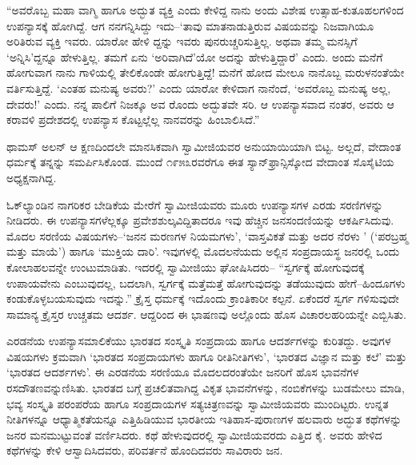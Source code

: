 “ಅವರೊಬ್ಬ ಮಹಾ ವಾಗ್ಮಿ ಹಾಗೂ ಅದ್ಭುತ ವ್ಯಕ್ತಿ ಎಂದು ಕೇಳಿದ್ದ ನಾನು ಅಂದು ವಿಶೇಷ ಉತ್ಸಾಹ-ಕುತೂಹಲಗಳಿಂದ ಉಪನ್ಯಾಸಕ್ಕೆ ಹೋಗಿದ್ದೆ. ಆಗ ನನಗನ್ನಿಸಿದ್ದು ಇದು–‘ತಾವು ಮಾತನಾಡುತ್ತಿರುವ ವಿಷಯವನ್ನು ನಿಜವಾಗಿಯೂ ಅರಿತಿರುವ ವ್ಯಕ್ತಿ ಇವರು. ಯಾರೋ ಹೇಳಿ ದ್ದನ್ನು ಇವರು ಪುನರುಚ್ಚರಿಸುತ್ತಿಲ್ಲ. ಅಥವಾ ತಮ್ಮ ಮನಸ್ಸಿಗೆ ‘ಅನ್ನಿಸಿ’ದ್ದನ್ನೂ ಹೇಳುತ್ತಿಲ್ಲ. ತಮಗೆ ಏನು ‘ಅರಿವಾಗಿದೆ’ಯೋ ಅದನ್ನು ಹೇಳುತ್ತಿದ್ದಾರೆ’ ಎಂದು. ಅಂದು ಮನೆಗೆ ಹೋಗುವಾಗ ನಾನು ಗಾಳಿಯಲ್ಲಿ ತೇಲಿಕೊಂಡೇ ಹೋಗುತ್ತಿದ್ದೆ! ಮನೆಗೆ ಹೋದ ಮೇಲೂ ನಾನೊಬ್ಬ ಮರುಳನಂತೆಯೇ ವರ್ತಿಸುತ್ತಿದ್ದೆ. ‘ಎಂತಹ ಮನುಷ್ಯ ಅವರು?’ ಎಂದು ಯಾರೋ ಕೇಳಿದಾಗ ನಾನೆಂದೆ, ‘ಅವರೊಬ್ಬ ಮನುಷ್ಯ ಅಲ್ಲ, ದೇವರು!’ ಎಂದು. ನನ್ನ ಪಾಲಿಗೆ ನಿಜಕ್ಕೂ ಅವ ರೊಂದು ಅದ್ಭುತವೇ ಸರಿ. ಆ ಉಪನ್ಯಾಸವಾದ ನಂತರ, ಅವರು ಆ ಕರಾವಳಿ ಪ್ರದೇಶದಲ್ಲಿ ಉಪನ್ಯಾಸ ಕೊಟ್ಟಲ್ಲೆಲ್ಲ ನಾನವರನ್ನು ಹಿಂಬಾಲಿಸಿದೆ.”

ಥಾಮಸ್ ಅಲನ್ ಆ ಕ್ಷಣದಿಂದಲೇ ಮಾನಸಿಕವಾಗಿ ಸ್ವಾಮೀಜಿಯವರ ಅನುಯಾಯಿಯಾಗಿ ಬಿಟ್ಟ. ಅಲ್ಲದೆ, ವೇದಾಂತ ಧರ್ಮಕ್ಕೆ ತನ್ನನ್ನು ಸಮರ್ಪಿಸಿಕೊಂಡ. ಮುಂದೆ ೧೯೫೩ರವರೆಗೂ ಈತ ಸ್ಯಾನ್​ಫ್ರಾನ್ಸಿಸ್ಕೋದ ವೇದಾಂತ ಸೊಸೈಟಿಯ ಅಧ್ಯಕ್ಷನಾಗಿದ್ದ.

ಓಕ್​ಲ್ಯಾಂಡಿನ ನಾಗರಿಕರ ಬೇಡಿಕೆಯ ಮೇರೆಗೆ ಸ್ವಾಮೀಜಿಯವರು ಮೂರು ಉಪನ್ಯಾಸಗಳ ಎರಡು ಸರಣಿಗಳನ್ನು ನೀಡಿದರು. ಈ ಉಪನ್ಯಾಸಗಳೆಲ್ಲಕ್ಕೂ ಪ್ರವೇಶಶುಲ್ಕವಿದ್ದಿತಾದರೂ ಇವು ಹೆಚ್ಚಿನ ಜನಸಂದಣಿಯನ್ನು ಆಕರ್ಷಿಸಿದುವು. ಮೊದಲ ಸರಣಿಯ ವಿಷಯಗಳು–‘ಜನನ ಮರಣಗಳ ನಿಯಮಗಳು’, ‘ವಾಸ್ತವಿಕತೆ ಮತ್ತು ಅದರ ನೆರಳು ’ (‘ಪರಬ್ರಹ್ಮ ಮತ್ತು ಮಾಯೆ’) ಹಾಗೂ ‘ಮುಕ್ತಿಯ ದಾರಿ’. ಇವುಗಳಲ್ಲಿ ಮೊದಲನೆಯದು ಅಲ್ಲಿನ ಸಂಪ್ರದಾಯಸ್ಥ ಜನರಲ್ಲಿ ಒಂದು ಕೋಲಾಹಲವನ್ನೇ ಉಂಟುಮಾಡಿತು. ಇದರಲ್ಲಿ ಸ್ವಾಮೀಜಿಯು ಘೋಷಿಸಿದರು– “ಸ್ವರ್ಗಕ್ಕೆ ಹೋಗುವುದಕ್ಕೆ ಉಪಾಯವೇನು ಎಂಬುವುದಲ್ಲ, ಬದಲಾಗಿ, ಸ್ವರ್ಗಕ್ಕೆ ಮತ್ತೆಮತ್ತೆ ಹೋಗುವುದನ್ನು ತಡೆಯುವುದು ಹೇಗೆ–ಹಿಂದೂಗಳು ಕಂಡುಕೊಳ್ಳಬಯಸುವುದು ಇದನ್ನು.” ಕ್ರೈಸ್ತ ಧರ್ಮಕ್ಕೆ ಇದೊಂದು ಕ್ರಾಂತಿಕಾರೀ ಕಲ್ಪನೆ. ಏಕೆಂದರೆ ಸ್ವರ್ಗ ಗಳಿಸುವುದೇ ಸಾಮಾನ್ಯ ಕ್ರೈಸ್ತರ ಉಚ್ಚತಮ ಆದರ್ಶ. ಆದ್ದರಿಂದ ಈ ಭಾಷಣವು ಅಲ್ಲೊಂದು ಹೊಸ ವಿಚಾರಲಹರಿಯನ್ನೇ ಎಬ್ಬಿಸಿತು.

ಎರಡನೆಯ ಉಪನ್ಯಾಸಮಾಲಿಕೆಯು ಭಾರತದ ಸಂಸ್ಕೃತಿ ಸಂಪ್ರದಾಯ ಹಾಗೂ ಆದರ್ಶಗಳನ್ನು ಕುರಿತದ್ದು. ಅವುಗಳ ವಿಷಯಗಳು ಕ್ರಮವಾಗಿ ‘ಭಾರತದ ಸಂಪ್ರದಾಯಗಳು ಹಾಗೂ ರೀತಿನೀತಿಗಳು’, ‘ಭಾರತದ ವಿಜ್ಞಾನ ಮತ್ತು ಕಲೆ’ ಮತ್ತು ‘ಭಾರತದ ಆದರ್ಶಗಳು’. ಈ ಎರಡನೆಯ ಸರಣಿಯೂ ಮೊದಲದರಂತೆಯೇ ಜನರಿಗೆ ಹೊಸ ಭಾವನೆಗಳ ರಸದೌತಣವನ್ನುಣಿಸಿತು. ಭಾರತದ ಬಗ್ಗೆ ಪ್ರಚಲಿತವಾಗಿದ್ದ ವಿಕೃತ ಭಾವನೆಗಳನ್ನು, ನಂಬಿಕೆಗಳನ್ನು ಬುಡಮೇಲು ಮಾಡಿ, ಭವ್ಯ ಸಂಸ್ಕೃತಿ ಪರಂಪರೆಯ ಹಾಗೂ ಸಂಪ್ರದಾಯಗಳ ಸತ್ಯಚಿತ್ರಣವನ್ನು ಸ್ವಾಮೀಜಿಯವರು ಮುಂದಿಟ್ಟರು. ಉನ್ನತ ನೀತಿಗಳನ್ನೂ ಆಧ್ಯಾತ್ಮಿಕತೆಯನ್ನೂ ಎತ್ತಿಹಿಡಿಯುವ ಭಾರತೀಯ ಇತಿಹಾಸ-ಪುರಾಣಗಳ ಹಲವಾರು ಅದ್ಭುತ ಕಥೆಗಳನ್ನು ಜನರ ಮನಮುಟ್ಟುವಂತೆ ವರ್ಣಿಸಿದರು. ಕಥೆ ಹೇಳುವುದರಲ್ಲಿ ಸ್ವಾಮೀಜಿಯವರದು ಎತ್ತಿದ ಕೈ. ಅವರು ಹೇಳಿದ ಕಥೆಗಳನ್ನು ಕೇಳಿ ಆಸ್ವಾದಿಸಿದವರು, ಪರಿವರ್ತನೆ ಹೊಂದಿದವರು ಸಾವಿರಾರು ಜನ.

